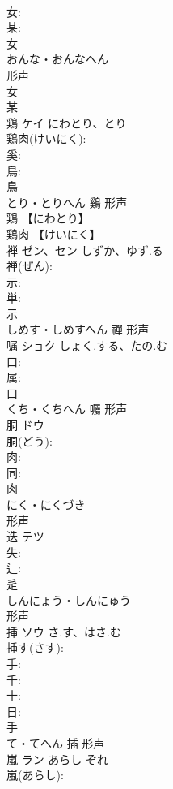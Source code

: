 \documentclass[8pt]{extreport}
\begin{document}
\begin{CJK}{UTF8}{min}
\\	女: 
\\	某: 
\\	女	
\\	おんな・おんなへん	
\\	形声 
\\	女 
\\	某
\\	鶏	ケイ	にわとり、とり		
\\	鶏肉(けいにく): 
\\	奚: 
\\	鳥: 
\\	鳥	
\\	とり・とりへん	鷄	形声 
\\	鶏 【にわとり】 
\\	鶏肉 【けいにく】 
\\	禅	ゼン、セン	しずか、ゆず.る		
\\	禅(ぜん): 
\\	示: 
\\	単: 
\\	示	
\\	しめす・しめすへん	禪	形声 
\\	嘱	ショク	しょく.する、たの.む		
\\	口: 
\\	属: 
\\	口	
\\	くち・くちへん	囑	形声 
\\	胴	ドウ			
\\	胴(どう): 
\\	肉: 
\\	同: 
\\	肉	
\\	にく・にくづき	
\\	形声 
\\	迭	テツ			
\\	失: 
\\	辶: 
\\	辵	
\\	しんにょう・しんにゅう	
\\	形声 
\\	挿	ソウ	さ.す、はさ.む		
\\	挿す(さす): 
\\	手: 
\\	千: 
\\	十: 
\\	日: 
\\	手	
\\	て・てへん	插	形声 
\\	嵐	ラン	あらし	ぞれ	
\\	嵐(あらし): 

\end{CJK}
\end{document}
